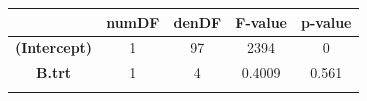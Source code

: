 \documentclass[]{article}
\begin{document}
\begin{longtable}[]{@{}ccccc@{}}
\toprule
\begin{minipage}[b]{0.29\columnwidth}\centering\strut
~
\strut\end{minipage} &
\begin{minipage}[b]{0.10\columnwidth}\centering\strut
numDF
\strut\end{minipage} &
\begin{minipage}[b]{0.10\columnwidth}\centering\strut
denDF
\strut\end{minipage} &
\begin{minipage}[b]{0.12\columnwidth}\centering\strut
F-value
\strut\end{minipage} &
\begin{minipage}[b]{0.12\columnwidth}\centering\strut
p-value
\strut\end{minipage}\tabularnewline
\midrule
\endhead
\begin{minipage}[t]{0.29\columnwidth}\centering\strut
\textbf{(Intercept)}
\strut\end{minipage} &
\begin{minipage}[t]{0.10\columnwidth}\centering\strut
1
\strut\end{minipage} &
\begin{minipage}[t]{0.10\columnwidth}\centering\strut
97
\strut\end{minipage} &
\begin{minipage}[t]{0.12\columnwidth}\centering\strut
2394
\strut\end{minipage} &
\begin{minipage}[t]{0.12\columnwidth}\centering\strut
0
\strut\end{minipage}\tabularnewline
\begin{minipage}[t]{0.29\columnwidth}\centering\strut
\textbf{B.trt}
\strut\end{minipage} &
\begin{minipage}[t]{0.10\columnwidth}\centering\strut
1
\strut\end{minipage} &
\begin{minipage}[t]{0.10\columnwidth}\centering\strut
4
\strut\end{minipage} &
\begin{minipage}[t]{0.12\columnwidth}\centering\strut
0.4009
\strut\end{minipage} &
\begin{minipage}[t]{0.12\columnwidth}\centering\strut
0.561
\strut\end{minipage}\tabularnewline
\begin{minipage}[t]{0.29\columnwidth}\centering\strut

\end{minipage}
\end{longtable}
\end{document}
